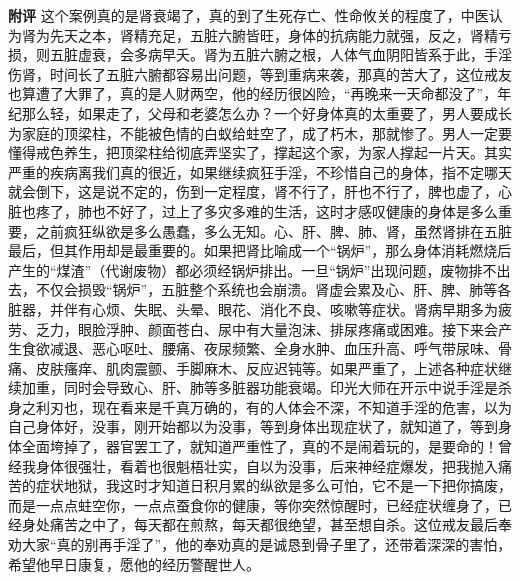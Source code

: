 \begin{case}
    \textbf{附评} 这个案例真的是肾衰竭了，真的到了生死存亡、性命攸关的程度了，中医认为肾为先天之本，肾精充足，五脏六腑皆旺，身体的抗病能力就强，反之，肾精亏损，则五脏虚衰，会多病早夭。肾为五脏六腑之根，人体气血阴阳皆系于此，手淫伤肾，时间长了五脏六腑都容易出问题，等到重病来袭，那真的苦大了，这位戒友也算遭了大罪了，真的是人财两空，他的经历很凶险，“再晚来一天命都没了”，年纪那么轻，如果走了，父母和老婆怎么办？一个好身体真的太重要了，男人要成长为家庭的顶梁柱，不能被色情的白蚁给蛀空了，成了朽木，那就惨了。男人一定要懂得戒色养生，把顶梁柱给彻底弄坚实了，撑起这个家，为家人撑起一片天。其实严重的疾病离我们真的很近，如果继续疯狂手淫，不珍惜自己的身体，指不定哪天就会倒下，这是说不定的，伤到一定程度，肾不行了，肝也不行了，脾也虚了，心脏也疼了，肺也不好了，过上了多灾多难的生活，这时才感叹健康的身体是多么重要，之前疯狂纵欲是多么愚蠢，多么无知。心、肝、脾、肺、肾，虽然肾排在五脏最后，但其作用却是最重要的。如果把肾比喻成一个“锅炉”，那么身体消耗燃烧后产生的“煤渣”（代谢废物）都必须经锅炉排出。一旦“锅炉”出现问题，废物排不出去，不仅会损毁“锅炉”，五脏整个系统也会崩溃。肾虚会累及心、肝、脾、肺等各脏器，并伴有心烦、失眠、头晕、眼花、消化不良、咳嗽等症状。肾病早期多为疲劳、乏力，眼脸浮肿、颜面苍白、尿中有大量泡沫、排尿疼痛或困难。接下来会产生食欲减退、恶心呕吐、腰痛、夜尿频繁、全身水肿、血压升高、呼气带尿味、骨痛、皮肤瘙痒、肌肉震颤、手脚麻木、反应迟钝等。如果严重了，上述各种症状继续加重，同时会导致心、肝、肺等多脏器功能衰竭。印光大师在开示中说手淫是杀身之利刃也，现在看来是千真万确的，有的人体会不深，不知道手淫的危害，以为自己身体好，没事，刚开始都以为没事，等到身体出现症状了，就知道了，等到身体全面垮掉了，器官罢工了，就知道严重性了，真的不是闹着玩的，是要命的！曾经我身体很强壮，看着也很魁梧壮实，自以为没事，后来神经症爆发，把我抛入痛苦的症状地狱，我这时才知道日积月累的纵欲是多么可怕，它不是一下把你搞废，而是一点点蛀空你，一点点蚕食你的健康，等你突然惊醒时，已经症状缠身了，已经身处痛苦之中了，每天都在煎熬，每天都很绝望，甚至想自杀。这位戒友最后奉劝大家“真的别再手淫了”，他的奉劝真的是诚恳到骨子里了，还带着深深的害怕，希望他早日康复，愿他的经历警醒世人。
\end{case}

